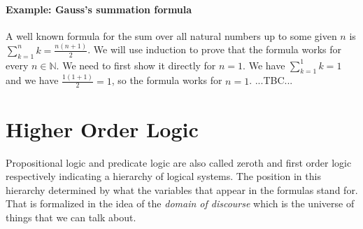 \paragraph{Example: Gauss's summation formula} A well known formula for the sum over all natural numbers up to some given $n$ is $\sum_{k=1}^n k = \frac{n (n+1)}{2}$. We will use induction to prove that the formula works for every $n \in \mathbb{N}$. We need to first show it directly for $n=1$. We have $\sum_{k=1}^1 k = 1$ and we have $\frac{1 (1+1)}{2} = 1$, so the formula works for $n=1$. ...TBC...





\section{Higher Order Logic}
Propositional logic and predicate logic are also called zeroth and first order logic respectively indicating a hierarchy of logical systems. The position in this hierarchy determined by what the variables that appear in the formulas stand for. That is formalized in the idea of the \emph{domain of discourse} which is the universe of things that we can talk about.

